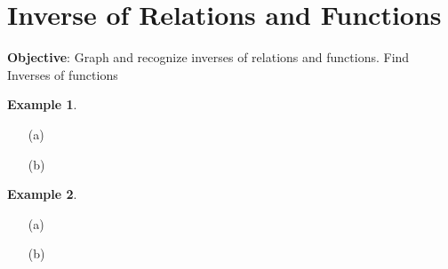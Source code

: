\documentclass{report}
\theoremstyle{definition}
\newtheorem{example}{\bf Example}
\begin{document}
 \noindent{} \hfill 

 \newpage

 \section{Inverse of Relations and Functions }
 \indent\hfill\small\noindent \textbf{Objective}: Graph and recognize inverses of relations and functions. Find Inverses of functions\normalsize\\
 \setcounter{example}{0}
 \setcounter{definition}{0}

\vspace{-0.5cm}

 \begin{example}

 \end{example}
\begin{minipage}[t]{0.45\linewidth}
	\begin{itemize}
		\item[(a)] 
	\end{itemize}
\end{minipage}
\begin{minipage}[t]{0.45\linewidth}
	\begin{itemize}
		\item[(b)] 
	\end{itemize}
\end{minipage}

\vfill

\begin{example}

\end{example}
\begin{minipage}[t]{0.45\linewidth}
	\begin{itemize}
		\item[(a)] 
	\end{itemize}
\end{minipage}
\begin{minipage}[t]{0.45\linewidth}
	\begin{itemize}
		\item[(b)] 
	\end{itemize}
\end{minipage}
\vfill
\end{document}
